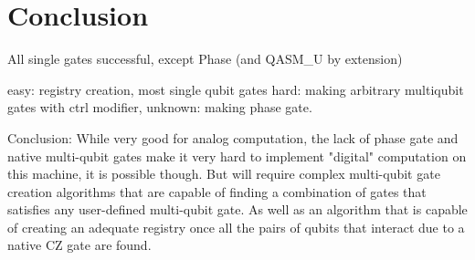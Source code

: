 \section{Conclusion}
All single gates successful, except Phase (and QASM\_U by extension)

easy: registry creation, most single qubit gates
hard: making arbitrary multiqubit gates with ctrl modifier, 
unknown: making phase gate.

Conclusion: While very good for analog computation, the lack of phase gate and native multi-qubit gates make it very hard to implement "digital" computation
on this machine, it is possible though. But will require complex multi-qubit gate creation algorithms that are capable of finding a combination of
 gates that satisfies any user-defined multi-qubit gate. As well as an algorithm that is capable of creating an adequate registry once all the pairs of qubits 
 that interact due to a native CZ gate are found.